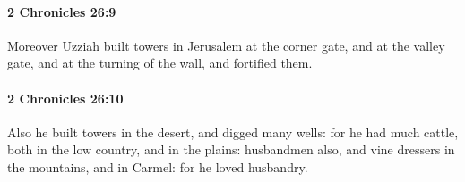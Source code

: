 		\paragraph{2 Chronicles 26:9} %
			\label{2CHRONICLES-26-9}

			Moreover Uzziah built towers in Jerusalem at the corner gate, and at the valley gate, and at the turning of the wall, and fortified them.


		\paragraph{2 Chronicles 26:10} %
			\label{2CHRONICLES-26-10}

			Also he built towers in the desert, and digged many wells: for he had much cattle, both in the low country, and in the plains: husbandmen also, and vine dressers in the mountains, and in Carmel: for he loved husbandry.

